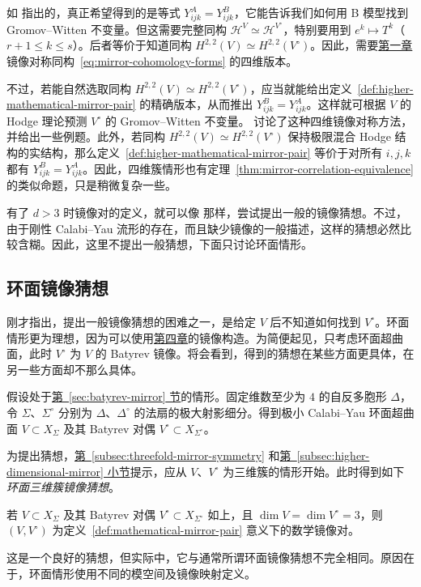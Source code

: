 \begin{example}
如  指出的，真正希望得到的是等式 $Y^A_{ijk}=Y^B_{ijk}$，它能告诉我们如何用 B 模型找到 Gromov--Witten 不变量。但这需要完整同构 $\mathcal H^V\simeq\mathcal H^{V^\circ}$，特别要用到 $e^k\mapsto T^k$（$r+1\le k\le s$）。后者等价于知道同构 $H^{2,2}(V)\simeq H^{2,2}(V^\circ)$。因此，需要\hyperref[chap:introduction]{第一章}镜像对称同构~\eqref{eq:mirror-cohomology-forms} 的四维版本。

不过，若能自然选取同构 $H^{2,2}(V)\simeq H^{2,2}(V^\circ)$，应当就能给出定义~\ref{def:higher-mathematical-mirror-pair} 的精确版本，从而推出 $Y^B_{ijk}=Y^A_{ijk}$。这样就可根据 $V$ 的 Hodge 理论预测 $V^\circ$ 的 Gromov--Witten 不变量。 讨论了这种四维镜像对称方法，并给出一些例题。此外，若同构 $H^{2,2}(V)\simeq H^{2,2}(V^\circ)$ 保持极限混合 Hodge 结构的实结构，那么定义~\ref{def:higher-mathematical-mirror-pair} 等价于对所有 $i,j,k$ 都有 $Y^B_{ijk}=Y^A_{ijk}$。因此，四维簇情形也有定理~\ref{thm:mirror-correlation-equivalence} 的类似命题，只是稍微复杂一些。
\end{example}
有了 $d>3$ 时镜像对的定义，就可以像  那样，尝试提出一般的镜像猜想。不过，由于刚性 Calabi--Yau 流形的存在，而且缺少镜像的一般描述，这样的猜想必然比较含糊。因此，这里不提出一般猜想，下面只讨论环面情形。

\subsection{环面镜像猜想}\label{subsec:toric-mirror-conjecture}
刚才指出，提出一般镜像猜想的困难之一，是给定 $V$ 后不知道如何找到 $V^\circ$。环面情形更为理想，因为可以使用\hyperref[chap:mirror-constructions]{第四章}的镜像构造。为简便起见，只考虑环面超曲面，此时 $V^\circ$ 为 $V$ 的 Batyrev 镜像。将会看到，得到的猜想在某些方面更具体，在另一些方面却不那么具体。

假设处于\hyperref[sec:batyrev-mirror]{第~\ref*{sec:batyrev-mirror} 节}的情形。固定维数至少为 $4$ 的自反多胞形 $\Delta$，令 $\Sigma$、$\Sigma^\circ$ 分别为 $\Delta$、$\Delta^\circ$ 的法扇的极大射影细分。得到极小 Calabi--Yau 环面超曲面 $V\subset X_\Sigma$ 及其 Batyrev 对偶 $V^\circ\subset X_{\Sigma^\circ}$。

为提出猜想，\hyperref[subsec:threefold-mirror-symmetry]{第~\ref*{subsec:threefold-mirror-symmetry}} 和\hyperref[subsec:higher-dimensional-mirror]{第~\ref*{subsec:higher-dimensional-mirror} 小节}提示，应从 $V$、$V^\circ$ 为三维簇的情形开始。此时得到如下\emph{环面三维簇镜像猜想}。
\begin{conjecture}\label{conj:toric-threefold-mirror}
若 $V\subset X_\Sigma$ 及其 Batyrev 对偶 $V^\circ\subset X_{\Sigma^\circ}$ 如上，且 $\dim V=\dim V^\circ=3$，则 $(V,V^\circ)$ 为定义~\ref{def:mathematical-mirror-pair} 意义下的数学镜像对。
\end{conjecture}
这是一个良好的猜想，但实际中，它与通常所谓环面镜像猜想不完全相同。原因在于，环面情形使用不同的模空间及镜像映射定义。

